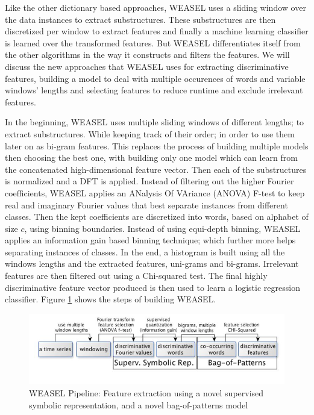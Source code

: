 Like the other dictionary based approaches, WEASEL uses a sliding window over the data instances to extract substructures.
These substructures are then discretized per window to extract features and finally a machine learning classifier is learned over the transformed features.
But WEASEL differentiates itself from the other algorithms in the way it constructs and filters the features.
We will discuss the new approaches that WEASEL uses for extracting discriminative features, building a model to deal with multiple occurences of words and variable windows' lengths
and selecting features to reduce runtime and exclude irrelevant features.

In the beginning, WEASEL uses multiple sliding windows of different lengths; to extract substructures.
While keeping track of their order; in order to use them later on as bi-gram features.
This replaces the process of building multiple models then choosing the best one, with building only one model which can learn from the concatenated high-dimensional feature vector.
Then each of the substructures is normalized and a DFT is applied.
Instead of filtering out the higher Fourier coefficients, WEASEL applies an ANalysis Of VAriance (ANOVA) F-test to keep real and imaginary Fourier values that best separate instances from different classes.
Then the kept coefficients are discretized into words, based on alphabet of size $c$, using binning boundaries. Instead of using equi-depth binning, WEASEL applies an information gain based
binning technique; which further more helps separating instances of classes.
In the end, a histogram is built using all the windows lengths and the extracted features, uni-grams and bi-grams.
Irrelevant features are then filtered out using a Chi-squared test. The final highly discriminative feature vector produced is then used to learn a logistic regression classifier.
Figure \ref{Img:WEASELFlow} shows the steps of building WEASEL.

\begin{figure}[!htbp]
    \captionsetup{justification=raggedright}
    \centering
    \includegraphics[scale = 0.5]{WEASELFlow.JPG}
    \centering
    \caption{WEASEL Pipeline: Feature extraction using a novel supervised symbolic representation, and a novel bag-of-patterns model \cite{schafer2017fast}}
    \label{Img:WEASELFlow}
\end{figure}

